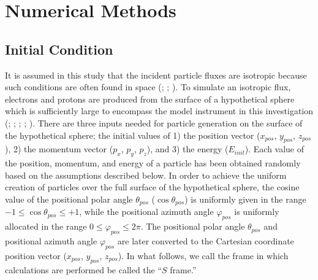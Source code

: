 \documentclass{jkas}
\begin{document}
\section{Numerical Methods\label{sec:nummet}}

\subsection{Initial Condition\label{sec:initcon}}

It is assumed in this study that the incident particle fluxes are isotropic because such conditions are often found in space (\citealt{wilson1991}; \citealt{ncrp2006}; \citealt{durante2011}). To simulate an isotropic flux, electrons and protons are produced from the surface of a hypothetical sphere which is sufficiently large to encompass the model instrument in this investigation (\citealt{wilson2005}; \citealt{ersmark2006}; \citealt{yando2011}; \citealt{martinez2012}; \citealt{zhao2013}).
There are three inputs needed for particle generation on the surface of the hypothetical sphere; the initial values of 1) the position vector ($x_{pos}$, $y_{pos}$, $z_{pos}$), 2) the momentum vector ($p_x$, $p_y$, $p_z$), and 3) the energy ($E_{init}$). Each value of the position, momentum, and energy of a particle has been obtained randomly based on the assumptions described below. In order to achieve the uniform creation of particles over the full surface of the hypothetical sphere, the cosine value of the positional polar angle $\theta_{pos}$ ($\cos\theta_{pos}$) is uniformly given in the range $-1\le\cos\theta_{pos}\le+1$, while the positional azimuth angle $\varphi_{pos}$ is uniformly allocated in the range $0\le\varphi_{pos}\le2\pi$. The positional polar angle $\theta_{pos}$ and positional azimuth angle $\varphi_{pos}$ are later converted to the Cartesian coordinate position vector ($x_{pos}$, $y_{pos}$, $z_{pos}$). In what follows, we call the frame in which calculations are performed be called the “$S$ frame.”
\end{document}
